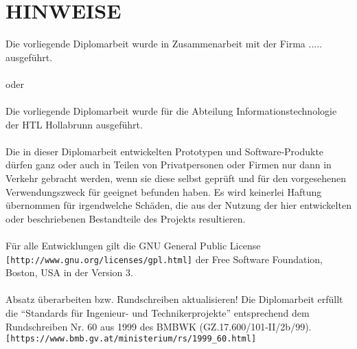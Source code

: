 \chapter*{HINWEISE}

Die vorliegende Diplomarbeit wurde in Zusammenarbeit mit der Firma ..... ausgeführt. \\
~ \\
oder \\
~ \\
Die vorliegende Diplomarbeit wurde für die Abteilung Informationstechnologie der HTL Hollabrunn ausgeführt. \\
~ \\
Die in dieser Diplomarbeit entwickelten Prototypen und Software-Produkte dürfen ganz oder auch in Teilen von Privatpersonen oder Firmen nur dann in Verkehr gebracht werden, wenn sie diese selbst geprüft und für den vorgesehenen Verwendungszweck für geeignet befunden haben.
Es wird keinerlei Haftung übernommen für irgendwelche Schäden, die aus der Nutzung der hier entwickelten oder beschriebenen Bestandteile des Projekts resultieren. \\
~ \\
Für alle Entwicklungen gilt die GNU General Public License \verb|[http://www.gnu.org/licenses/gpl.html]| der Free Software Foundation, Boston, USA in der Version 3. \\
~ \\
Absatz überarbeiten bzw. Rundschreiben aktualisieren!
Die Diplomarbeit erfüllt die “Standards für Ingenieur- und Technikerprojekte” entsprechend dem Rundschreiben Nr. 60 aus 1999 des BMBWK (GZ.17.600/101-II/2b/99).
\verb|[https://www.bmb.gv.at/ministerium/rs/1999_60.html]|
